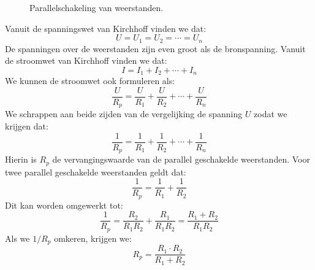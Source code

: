 \begin{figure}[!ht]
\centering
{}
\caption{Parallelschakeling van weerstanden.}
\label{fig:gelparalledschakelingweerstanden}
\end{figure}

Vanuit de spanningswet van Kirchhoff vinden we dat:
%
\begin{equation}
U = U_1 = U_2 = \cdots = U_n
\end{equation}
%
De spanningen over de weerstanden zijn even groot als de bronspanning.
Vanuit de stroomwet van Kirchhoff vinden we dat:
%
\begin{equation}
I = I_1 + I_2 + \cdots + I_n
\end{equation}
%
We kunnen de stroomwet ook formuleren als:
%
\begin{equation}
\dfrac{U}{R_p} = \dfrac{U}{R_1} + \dfrac{U}{R_2} + \cdots + \dfrac{U}{R_n}
\end{equation}
%
We schrappen aan beide zijden van de vergelijking de spanning $U$ zodat we krijgen dat:
%
\begin{equation}
\dfrac{1}{R_p} = \dfrac{1}{R_1} + \dfrac{1}{R_2} + \cdots + \dfrac{1}{R_n}
\end{equation}
%
Hierin is $R_p$ de vervangingswaarde van de parallel geschakelde weerstanden.
Voor twee parallel geschakelde weerstanden geldt dat:
\begin{equation}
\dfrac{1}{R_p} = \dfrac{1}{R_1} + \dfrac{1}{R_2}
\end{equation}
%
Dit kan worden omgewerkt tot:
%
\begin{equation}
\dfrac{1}{R_p} = \dfrac{R_2}{R_1R_2} + \dfrac{R_1}{R_1R_2} = \dfrac{R_1+R_2}{R_1R_2}
\end{equation}
%
Als we $1/R_p$ omkeren, krijgen we:
\begin{equation}
R_p = \dfrac{R_1\cdot R_2}{R_1+R_2}
\end{equation}

